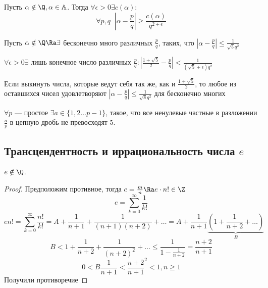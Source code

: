 
\begin{theorem}[Roth]
    Пусть \(\alpha \notin \Q, \alpha \in \mathbb{A}\). Тогда \(\forall \epsilon > 0 \exists c(\alpha):\)
    \[\forall p, q\;\;\left|\alpha - \frac{p}{q}\right| \ge \frac{c(\alpha)}{q^{2 + \epsilon}}\]
\end{theorem}

\begin{theorem}
    Пусть \(\alpha \notin \Q \Ra \exists\) бесконечно много различных \(\frac{p}{q}\), таких, что \(\left|\alpha - \frac{p}{q}\right| \le \frac{1}{\sqrt{5}q^2}\)
\end{theorem}

\begin{theorem}
    \(\forall \epsilon > 0 \exists\) лишь конечное число различных \(\frac{p}{q}: \left|\frac{1 + \sqrt{5}}{2} - \frac{p}{q}\right| < \frac{1}{(\sqrt{5} + \epsilon)q^2}\)
\end{theorem}

\begin{theorem}
    Если выкинуть числа, которые ведут себя так же, как и \(\frac{1 + \sqrt{5}}{2}\), то любое из оставшихся чисел удовлетворяют \(\left|\alpha - \frac{p}{q}\right| \le \frac{1}{\sqrt{8}q^2}\) для бесконечно многих 
\end{theorem}

\begin{proposition}
    \(\forall p\) --- простое \(\exists a \in \{1, 2 \dots p - 1\}\), такое, что все ненулевые частные в разложении \(\frac{a}{p}\) в цепную дробь не превосходят 5.
\end{proposition}

\subsection{Трансцендентность и иррациональность числа \(e\)}
\begin{theorem}
    \(e \notin \Q\).
\end{theorem}
\begin{proof}
    Предположим противное, тогда \(e = \frac{m}{n} \Ra e\cdot n! \in \Z\)
    \[e = \sum_{k = 0}^\infty \frac{1}{k!}\]
    \[en! = \sum_{k = 0}^\infty \frac{n!}{k!} = A + \frac{1}{n + 1} + \frac{1}{(n + 1)(n + 2)} + \dots = A + \frac{1}{n + 1}\underbrace{\left(1 + \frac{1}{n + 2} + \dots \right)}_{B}\]
    \[B < 1 + \frac{1}{n + 2} + \frac{1}{(n + 2)^2} + \dots \le \frac{1}{1 - \frac{1}{n + 2}} = \frac{n + 2}{n + 1}\]
    \[0 < B \frac{1}{n + 1} < \frac{n + 2}{n + 1}^2 < 1, n \ge 1\]
    Получили противоречие
\end{proof}

